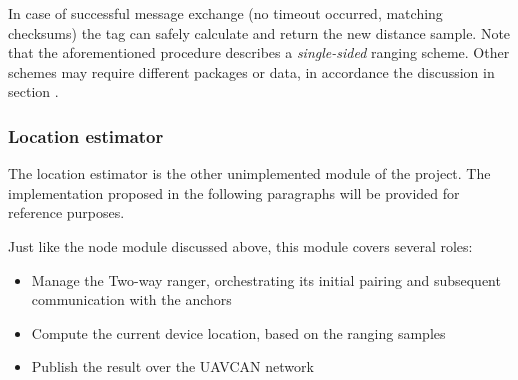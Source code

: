 In case of successful message exchange (no timeout occurred, matching checksums) the tag can safely calculate and return the new distance sample.
Note that the aforementioned procedure describes a \emph{single-sided} ranging scheme.
Other schemes may require different packages or data, in accordance the discussion in section .


\subsubsection{Location estimator}
The location estimator is the other unimplemented module of the project.
The implementation proposed in the following paragraphs will be provided for reference purposes.

Just like the node module discussed above, this module covers several roles:
\begin{itemize}
    \item Manage the Two-way ranger, orchestrating its initial pairing and subsequent communication with the anchors
    \item Compute the current device location, based on the ranging samples
    \item Publish the result over the UAVCAN network
\end{itemize}
